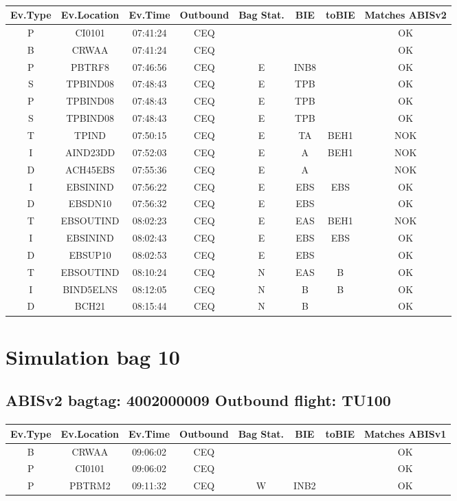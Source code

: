 \documentclass{report}
\begin{document}
\paragraph{}
\begin{longtable}{cccccccc}    \toprule
\rowcolor{white!50}
\textbf{Ev.Type} & \textbf{Ev.Location} & \textbf{Ev.Time} & \textbf{Outbound} & \textbf{Bag Stat.} & \textbf{BIE} & \textbf{toBIE} & \textbf{Matches ABISv2} \\\midrule
P & CI0101 & 07:41:24  & CEQ &  &  &  & OK\\
B & CRWAA & 07:41:24  & CEQ &  &  &  & OK\\
P & PBTRF8 & 07:46:56  & CEQ & E & INB8 &  & OK\\
S & TPBIND08 & 07:48:43  & CEQ & E & TPB &  & OK\\
P & TPBIND08 & 07:48:43  & CEQ & E & TPB &  & OK\\
S & TPBIND08 & 07:48:43  & CEQ & E & TPB &  & OK\\
T & TPIND & 07:50:15  & CEQ & E & TA & BEH1 & NOK\\
I & AIND23DD & 07:52:03  & CEQ & E & A & BEH1 & NOK\\
D & ACH45EBS & 07:55:36  & CEQ & E & A &  & NOK\\
I & EBSININD & 07:56:22  & CEQ & E & EBS & EBS & OK\\
D & EBSDN10 & 07:56:32  & CEQ & E & EBS &  & OK\\
T & EBSOUTIND & 08:02:23  & CEQ & E & EAS & BEH1 & NOK\\
I & EBSININD & 08:02:43  & CEQ & E & EBS & EBS & OK\\
D & EBSUP10 & 08:02:53  & CEQ & E & EBS &  & OK\\
T & EBSOUTIND & 08:10:24  & CEQ & N & EAS & B & OK\\
I & BIND5ELNS & 08:12:05  & CEQ & N & B & B & OK\\
D & BCH21 & 08:15:44  & CEQ & N & B &  & OK\\
\bottomrule
\end{longtable}
\pagebreak
\section*{Simulation bag 10}
\subsection*{ABISv2 bagtag: 4002000009 Outbound flight: TU100}
\paragraph{}
\begin{longtable}{cccccccc}    \toprule
\rowcolor{white!50}
\textbf{Ev.Type} & \textbf{Ev.Location} & \textbf{Ev.Time} & \textbf{Outbound} & \textbf{Bag Stat.} & \textbf{BIE} & \textbf{toBIE} & \textbf{Matches ABISv1} \\\midrule
B & CRWAA & 09:06:02  & CEQ &  &  &  & OK\\
P & CI0101 & 09:06:02  & CEQ &  &  &  & OK\\
P & PBTRM2 & 09:11:32  & CEQ & W & INB2 &  & OK\\
\bottomrule
\end{longtable}
\end{document}

